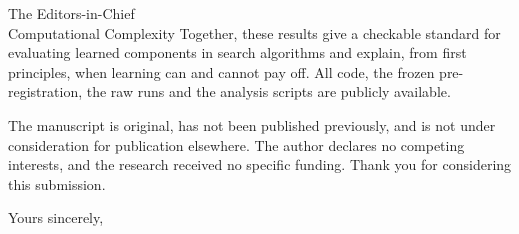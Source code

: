 \documentclass[11pt]{letter}
\begin{document}
\begin{letter}{The Editors-in-Chief\\Computational Complexity}
Together, these results give a checkable standard for evaluating learned components in search algorithms and explain,
from first principles, when learning can and cannot pay off. All code, the frozen pre-registration, the raw runs and
the analysis scripts are publicly available.

The manuscript is original, has not been published previously, and is not under consideration for publication
elsewhere. The author declares no competing interests, and the research received no specific funding. Thank you for
considering this submission.

\closing{Yours sincerely,}

\end{letter}
\end{document}
